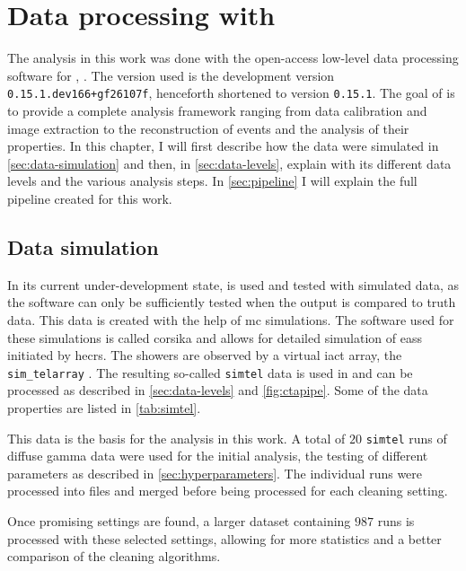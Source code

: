 \chapter{Data processing with \ctapipe{}}
\label{ch:data-processing}

The analysis in this work was done with the open-access low-level data processing software for \cta{},
\ctapipe{} \cite{ctapipe}. The version used is the development version \texttt{0.15.1.dev166+gf26107f},
henceforth shortened to version \texttt{0.15.1}. The goal of \ctapipe{} is to provide a complete analysis
framework ranging from data calibration and image extraction to the reconstruction of events and the
analysis of their properties. In this chapter, I will first describe how the data
were simulated in \autoref{sec:data-simulation} and then, in \autoref{sec:data-levels}, explain \ctapipe{}
with its different data levels and the various analysis steps. In \autoref{sec:pipeline} I will
explain the full pipeline created for this work.


\section{Data simulation}
\label{sec:data-simulation}

In its current under-development state, \ctapipe{} is used and tested with simulated data, as the software
can only be sufficiently tested when the output is compared to truth data. This data is created with the help of
\gls{mc} simulations. The software used for these simulations is called \gls{corsika} \cite{corsika} and
allows for detailed simulation of \glspl{eas} initiated by \glspl{hecr}. The showers are observed by
a virtual \gls{iact} array, the \texttt{sim\_telarray} \cite{bernlohr2008}. The resulting so-called
\texttt{simtel} data is used in \ctapipe{} and can be processed as described in \autoref{sec:data-levels}
and \autoref{fig:ctapipe}. Some of the data properties are listed in \autoref{tab:simtel}.

This data is the basis for the analysis in this work. A total of
\(\num{20}\) \texttt{simtel} runs of diffuse gamma data were used for the initial analysis, \ie the
testing of different parameters as described in \autoref{sec:hyperparameters}. The individual runs
were processed into \dlo{} files and merged before being processed for each cleaning setting.

Once promising settings are found, a larger dataset containing \(\num{987}\) runs is processed with these
selected settings, allowing for more statistics and a better comparison of the cleaning algorithms.

